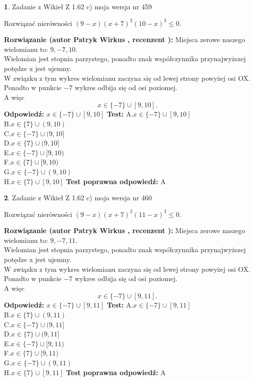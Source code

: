 \documentclass[12pt, a4paper]{article}
\theoremstyle{definition} %
\newtheorem{zad}{}
\newcommand{\zadStart}[1]{\begin{zad}#1\newline}
\newcommand{\zadStop}{\end{zad}}
\newcommand{\rozwStart}[2]{\noindent \textbf{Rozwiązanie (autor #1 , recenzent #2): }\newline}
\newcommand{\rozwStop}{\newline}
\newcommand{\odpStart}{\noindent \textbf{Odpowiedź:}\newline}
\newcommand{\odpStop}{\newline}
\newcommand{\testStart}{\noindent \textbf{Test:}\newline}
\newcommand{\testStop}{\newline}
\newcommand{\kluczStart}{\noindent \textbf{Test poprawna odpowiedź:}\newline}
\newcommand{\kluczStop}{\newline}
\begin{document}
\zadStart{Zadanie z Wikieł Z 1.62 c) moja wersja nr 459}

Rozwiązać nierówności $(9-x)(x+7)^{2}(10-x)^{3}\le0$.
\zadStop
\rozwStart{Patryk Wirkus}{}
Miejsca zerowe naszego wielomianu to: $9, -7, 10$.\\
Wielomian jest stopnia parzystego, ponadto znak współczynnika przy\linebreak najwyższej potędze x jest ujemny.\\ W związku z tym wykres wielomianu zaczyna się od lewej strony powyżej osi OX.\\
Ponadto w punkcie $-7$ wykres odbija się od osi poziomej.\\
A więc $$x \in \{-7\} \cup [9,10].$$
\rozwStop
\odpStart
$x \in \{-7\} \cup [9,10]$
\odpStop
\testStart
A.$x \in \{-7\} \cup [9,10]$\\
B.$x \in \{7\} \cup (9,10)$\\
C.$x \in \{-7\} \cup (9,10]$\\
D.$x \in \{7\} \cup (9,10]$\\
E.$x \in \{-7\} \cup [9,10)$\\
F.$x \in \{7\} \cup [9,10)$\\
G.$x \in \{-7\} \cup (9,10)$\\
H.$x \in \{7\} \cup [9,10]$
\testStop
\kluczStart
A
\kluczStop



\zadStart{Zadanie z Wikieł Z 1.62 c) moja wersja nr 460}

Rozwiązać nierówności $(9-x)(x+7)^{2}(11-x)^{3}\le0$.
\zadStop
\rozwStart{Patryk Wirkus}{}
Miejsca zerowe naszego wielomianu to: $9, -7, 11$.\\
Wielomian jest stopnia parzystego, ponadto znak współczynnika przy\linebreak najwyższej potędze x jest ujemny.\\ W związku z tym wykres wielomianu zaczyna się od lewej strony powyżej osi OX.\\
Ponadto w punkcie $-7$ wykres odbija się od osi poziomej.\\
A więc $$x \in \{-7\} \cup [9,11].$$
\rozwStop
\odpStart
$x \in \{-7\} \cup [9,11]$
\odpStop
\testStart
A.$x \in \{-7\} \cup [9,11]$\\
B.$x \in \{7\} \cup (9,11)$\\
C.$x \in \{-7\} \cup (9,11]$\\
D.$x \in \{7\} \cup (9,11]$\\
E.$x \in \{-7\} \cup [9,11)$\\
F.$x \in \{7\} \cup [9,11)$\\
G.$x \in \{-7\} \cup (9,11)$\\
H.$x \in \{7\} \cup [9,11]$
\testStop
\kluczStart
A
\kluczStop
\end{document}

